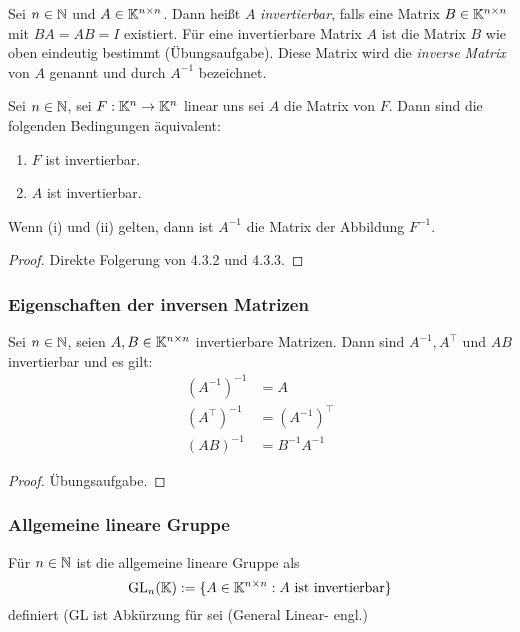 Sei $ n\in\mathbb N $ und $ A\in\mathbb K^{n \times n} $. Dann heißt $ A $ \emph{invertierbar}, falls eine Matrix $ B\in\mathbb K^{n \times n}$ mit $ BA = AB = I $ existiert. Für eine invertierbare Matrix $ A $ ist die Matrix $ B $ wie oben eindeutig bestimmt (Übungsaufgabe). Diese Matrix wird die \emph{inverse Matrix} von $ A $ genannt und durch $ A^{-1} $ bezeichnet.

\begin{propn}
	Sei $ n\in\mathbb N $, sei $ F:\mathbb K^n\to\mathbb K^n $ linear uns sei $ A $ die Matrix von $ F $. Dann sind die folgenden Bedingungen äquivalent:
	\begin{enumerate}
		\item $ F $ ist invertierbar.
		\item $ A $ ist invertierbar.
	\end{enumerate}
	Wenn {\normalfont(i)} und {\normalfont(ii)} gelten, dann ist $ A^{-1} $ die Matrix der Abbildung $ F^{-1} $.
\end{propn}
\begin{proof}
	Direkte Folgerung von 4.3.2 und 4.3.3.
\end{proof}

\subsubsection{Eigenschaften der inversen Matrizen}

\begin{propn}
	Sei $ n\in\mathbb N $, seien $ A,B\in\mathbb K^{n \times n} $ invertierbare Matrizen. Dann sind $ A^{-1}, A^\top $ und $ AB $ invertierbar und es gilt:
	\begin{align}
		(A^{-1})^{-1} &= A\\
		(A^\top)^{-1} &= (A^{-1})^\top\\
		(AB)^{-1} &= B^{-1}A^{-1}
	\end{align}
\end{propn}
\begin{proof}
	Übungsaufgabe.
\end{proof}

\subsubsection{Allgemeine lineare Gruppe}

Für $ n\in\mathbb N $ ist die allgemeine lineare Gruppe als 
\begin{equation}
	\operatorname{GL}_n(\mathbb K) := \{ A\in\mathbb K^{n \times n} : \text{$ A $ ist invertierbar} \}
\end{equation}
definiert (GL ist  Abkürzung für  sei (\glqq General Linear\grqq - engl.)


